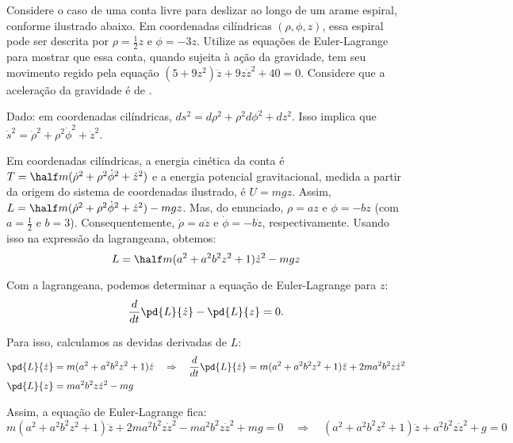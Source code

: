 \begin{question}
	Considere o caso de uma conta livre para deslizar ao longo de um arame espiral, conforme ilustrado abaixo.
	Em coordenadas cilíndricas $(\rho, \phi, z)$, essa espiral pode ser descrita por $\rho = \frac{1}{2}z$ e $\phi = -3z$. %
	Utilize as equações de Euler-Lagrange para mostrar que essa conta, quando sujeita à ação da gravidade, tem seu movimento regido pela equação $(5 + 9z^2)\ddot z + 9z\dot z^2 + 40 = 0$. %
	Considere que a aceleração da gravidade é de .


	\begin{compactdesc}
		\item[Dado:] em coordenadas cilíndricas, $ds^2 = d\rho^2 + \rho^2 d\phi^2 + dz^2$.
		Isso implica que $\dot s^2 = \dot\rho^2 + \rho^2 \dot\phi^2 + \dot z^2$.
	\end{compactdesc}

	\begin{solution}
		Em coordenadas cilíndricas, a energia cinética da conta é $T = \half m (\dot\rho^2 + \rho^2\dot\phi^2 + \dot z^2)$ e a energia potencial gravitacional, medida a partir da origem do sistema de coordenadas ilustrado, é $U = mgz$.
		Assim, $L = \half m (\dot\rho^2 + \rho^2\dot\phi^2 + \dot z^2) - mgz$.
		Mas, do enunciado, $\rho = az$ e $\phi = -bz$ (com $a = \frac{1}{2}$ e $b = 3$). %
		Consequentemente, $\dot\rho = a\dot z$ e $\dot \phi = -b\dot z$, respectivamente.
		Usando isso na expressão da lagrangeana, obtemos:
		\begin{equation*}
			L = \half m (a^2 + a^2 b^2 z^2 + 1) \dot z^2 - mgz
		\end{equation*}

		Com a lagrangeana, podemos determinar a equação de Euler-Lagrange para $z$:
		\begin{equation*}
			\frac{d}{dt}\pd{L}{\dot z} - \pd{L}{z} = 0.
		\end{equation*}

		Para isso, calculamos as devidas derivadas de $L$:
		\begin{align*}
			\pd{L}{\dot z} &= m (a^2 + a^2 b^2 z^2 + 1) \dot z \quad\Rightarrow\quad
				\frac{d}{dt}\pd{L}{\dot z} = m (a^2 + a^2 b^2 z^2 + 1) \ddot z + 2ma^2b^2z\dot z^2 \\
			\pd{L}{z} &= ma^2b^2z\dot z^2 - mg
		\end{align*}

		Assim, a equação de Euler-Lagrange fica:
		\begin{equation*}
			m (a^2 + a^2 b^2 z^2 + 1) \ddot z + 2ma^2b^2z\dot z^2 - ma^2b^2z\dot z^2 + mg = 0
			\quad\Rightarrow\quad
			(a^2 + a^2 b^2 z^2 + 1) \ddot z + a^2b^2z\dot z^2 + g = 0
		\end{equation*}


\end{solution}
\end{question}
